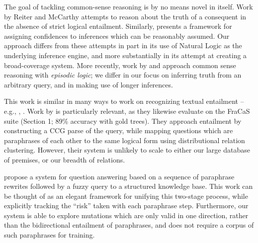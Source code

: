 The goal of tackling common-sense reasoning is by no means novel in
  itself.
Work by Reiter and McCarthy \cite{key:1980reiter-logic,key:1980mccarthy-circumscription}
  attempts to reason about the truth of a consequent
  in the absence of strict logical entailment.
Similarly,  presents a framework for
  assigning confidences to inferences which can be reasonably assumed.
Our approach differs from these attempts in part in its use of Natural Logic
  as the underlying inference engine, and more substantially in its
  attempt at creating a broad-coverage system.
More recently, work by  and
   approach common sense reasoning
  with \textit{episodic logic}; we differ in our focus on inferring
  truth from an arbitrary query, and in making use of longer inferences.

This work is similar in many ways to work on 
  recognizing textual entailment -- e.g., 
  , .
Work by  is particularly relevant,
  as they likewise evaluate on the FraCaS suite (Section 1;
  89\% accuracy with gold trees).
They approach entailment by constructing a CCG parse of the query,
  while mapping questions which are paraphrases of each other to the
  same logical form using distributional relation clustering.
However, their system is unlikely to scale to either our large
  database of premises, or our breadth of relations.

 propose a system for question answering
  based on a sequence of paraphrase rewrites followed by a fuzzy query to
  a structured knowledge base.
This work can be thought of as an elegant framework for unifying this
  two-stage process, while explicitly tracking the ``risk'' taken with
  each paraphrase step.
Furthermore, our system is able to explore mutations which are only
  valid in one direction, rather than the bidirectional entailment of
  paraphrases, and does not require a corpus of such paraphrases for
  training.



